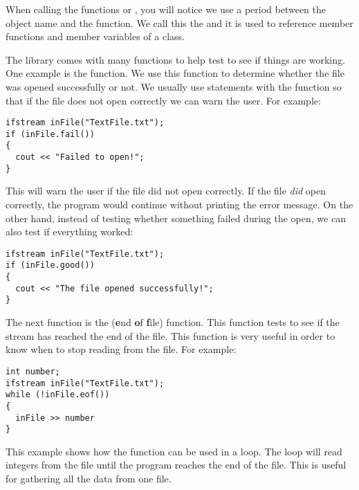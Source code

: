 When calling the functions  or , you will notice we use a period between the object name and the function. 
We call this the  and it is used to reference member functions and member variables of a class. 


The  library comes with many functions to help test to see if things are working. 
One example is the  function. 
We use this function to determine whether the file was opened successfully or not. 
We usually use  statements with the function so that if the file does not open correctly we can warn the user. 
For example:

\noindent\begin{minipage}{\linewidth}\begin{lstlisting}
ifstream inFile("TextFile.txt");
if (inFile.fail())
{ 
  cout << "Failed to open!";
}
\end{lstlisting}\end{minipage}

This will warn the user if the file did not open correctly. 
If the file \emph{did} open correctly, the program would continue without printing the error message.
On the other hand, instead of testing whether something failed during the open, we can also test if everything worked:

\noindent\begin{minipage}{\linewidth}\begin{lstlisting}
ifstream inFile("TextFile.txt");
if (inFile.good())
{ 
  cout << "The file opened successfully!";
}
\end{lstlisting}\end{minipage}

The next function is the  (\textbf{e}nd \textbf{o}f \textbf{f}ile) function. 
This function tests to see if the stream has reached the end of the file. 
This function is very useful in order to know when to stop reading from the file. 
For example:

\noindent\begin{minipage}{\linewidth}\begin{lstlisting}
int number;
ifstream inFile("TextFile.txt");
while (!inFile.eof())
{
  inFile >> number
}
\end{lstlisting}\end{minipage}

This example shows how the  function can be used in a  loop. 
The  loop will read integers from the file until the program reaches the end of the file. 
This is useful for gathering all the data from one file. 

